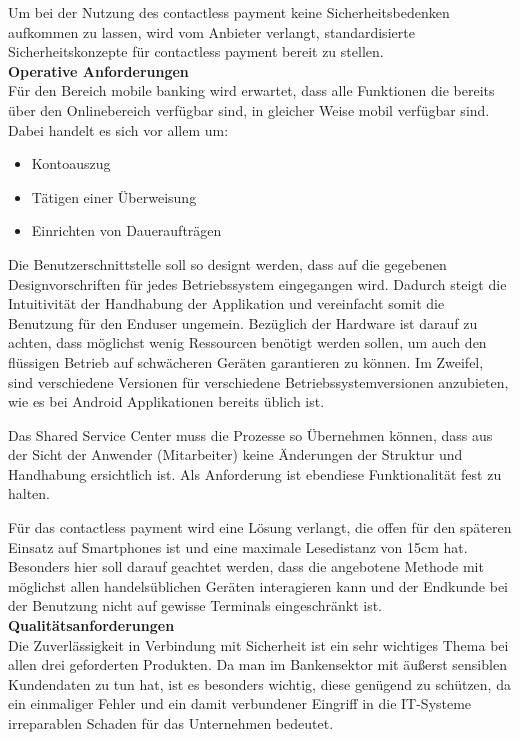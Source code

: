 Um bei der Nutzung des contactless payment keine Sicherheitsbedenken aufkommen zu lassen, wird vom Anbieter verlangt, standardisierte Sicherheitskonzepte f\"ur contactless payment bereit zu stellen.\\

\textbf{Operative Anforderungen}\\
F\"ur den Bereich mobile banking wird erwartet, dass alle Funktionen die bereits \"uber den Onlinebereich verf\"ugbar sind, in gleicher Weise mobil verf\"ugbar sind. Dabei handelt es sich vor allem um:
\begin{itemize}
\item Kontoauszug
\item T\"atigen einer \"Uberweisung
\item Einrichten von Dauerauftr\"agen
\end{itemize}
Die Benutzerschnittstelle soll so designt werden, dass auf die gegebenen Designvorschriften f\"ur jedes Betriebssystem eingegangen wird. Dadurch steigt die Intuitivit\"at der Handhabung der Applikation und vereinfacht somit die Benutzung f\"ur den Enduser ungemein. Bez\"uglich der Hardware ist darauf zu achten, dass m\"oglichst wenig Ressourcen ben\"otigt werden sollen, um auch den fl\"ussigen Betrieb auf schw\"acheren Ger\"aten garantieren zu k\"onnen. Im Zweifel, sind verschiedene Versionen f\"ur verschiedene Betriebssystemversionen anzubieten, wie es bei Android Applikationen bereits \"ublich ist. 

Das Shared Service Center muss die Prozesse so \"Ubernehmen k\"onnen, dass aus der Sicht der Anwender (Mitarbeiter) keine \"Anderungen der Struktur und Handhabung ersichtlich ist. Als Anforderung ist ebendiese Funktionalit\"at fest zu halten.

F\"ur das contactless payment wird eine L\"osung verlangt, die offen f\"ur den sp\"ateren Einsatz auf Smartphones ist und eine maximale Lesedistanz von 15cm hat. Besonders hier soll darauf geachtet werden, dass die angebotene Methode mit m\"oglichst allen handels\"ublichen Ger\"aten interagieren kann und der Endkunde bei der Benutzung nicht auf gewisse Terminals eingeschr\"ankt ist.\\

\textbf{Qualit\"atsanforderungen}\\
Die Zuverl\"assigkeit in Verbindung mit Sicherheit ist ein sehr wichtiges Thema bei allen drei geforderten Produkten. Da man im Bankensektor mit \"au\ss erst sensiblen Kundendaten zu tun hat, ist es besonders wichtig, diese gen\"ugend zu sch\"utzen, da ein einmaliger Fehler und ein damit verbundener Eingriff in die IT-Systeme irreparablen Schaden f\"ur das Unternehmen bedeutet.

